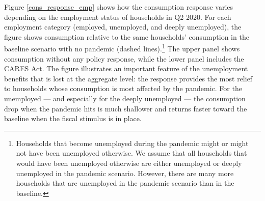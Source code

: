 \documentclass[titlepage]{\econtex}
\begin{document}
Figure \ref{cons_response_emp} shows how the consumption response varies depending on the employment status of households in Q2 2020.
For each employment category (employed, unemployed, and deeply unemployed), the figure shows consumption relative to the same households' consumption in the baseline scenario with no pandemic (dashed lines).\footnote{Households that become unemployed during the pandemic might or might not have been unemployed otherwise. We assume that all households that would have been unemployed otherwise are either unemployed or deeply unemployed in the pandemic scenario. However, there are many more households that are unemployed in the pandemic scenario than in the baseline.}
The upper panel shows consumption without any policy response, while the lower panel includes the CARES Act.
The figure illustrates an important feature of the unemployment benefits that is lost at the aggregate level: the response provides the most relief to households whose consumption is most affected by the pandemic.
For the unemployed --- and especially for the deeply unemployed --- the consumption drop when the pandemic hits is much shallower and returns faster toward the baseline when the fiscal stimulus is in place.
\end{document}

